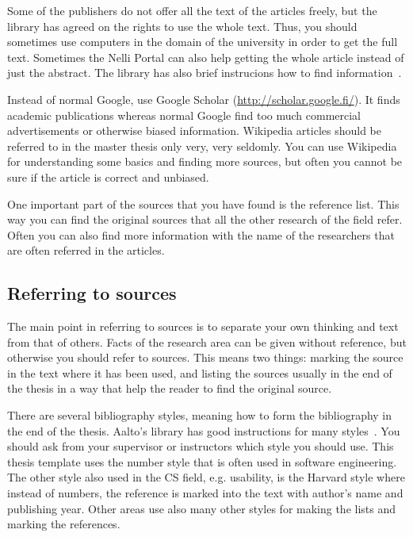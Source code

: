 \documentclass[12pt,a4paper,oneside,pdftex]{report}
\begin{document}
Some of the publishers do not offer all the text of the articles
freely, but the library has agreed on the rights to use the whole
text. Thus, you should sometimes use computers in the domain of the
university in order to get the full text. Sometimes the Nelli Portal
can also help getting the whole article instead of just the abstract.
The library has also brief instrucions how to find
information~\cite{howfindinfo}.

Instead of normal Google, use Google Scholar
(\url{http://scholar.google.fi/}). It finds academic publications whereas
normal Google find too much commercial advertisements or otherwise
biased information. Wikipedia articles should be referred to in the master
thesis only very, very seldomly. You can use Wikipedia for understanding
some basics and finding more sources, but often you cannot be sure if
the article is correct and unbiased.

One important part of the sources that you have found is the reference
list. This way you can find the original sources that all the other
research of the field refer. Often you can also find more information
with the name of the researchers that are often referred in the
articles.

\subsection{Referring to sources}

The main point in referring to sources is to separate your own
thinking and text from that of others. Facts of the research area can
be given without reference, but otherwise you should refer to
sources. This means two things: marking the source in the text where
it has been used, and listing the sources usually in the end of the
thesis in a way that help the reader to find the original source.

There are several bibliography styles, meaning how to form the
bibliography in the end of the thesis. Aalto's library has good
instructions for many styles~\cite{bibinstructions}. You should ask
from your supervisor or instructors which style you should use. This
thesis template uses the number style that is often used in software
engineering. The other style also used in the CS field,
e.g. usability, is the Harvard style where instead of numbers, the
reference is marked into the text with author's name and publishing
year. Other areas use also many other styles for making the lists and
marking the references.
\end{document}
